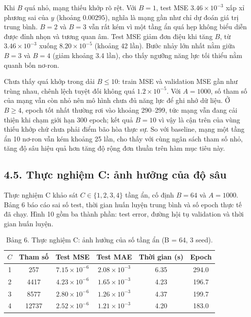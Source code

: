 \documentclass[12pt,a4paper]{article}
\begin{document}
Khi $B$ quá nhỏ, mạng thiếu khớp rõ rệt. Với $B=1$, test MSE $3.46\times10^{-3}$ xấp xỉ phương sai của $y$ (khoảng $0.00295$), nghĩa là mạng gần như chỉ dự đoán giá trị trung bình. $B=2$ và $B=3$ vẫn rất kém vì một tầng ẩn quá hẹp không biểu diễn được đỉnh nhọn và tương quan âm. Test MSE giảm đơn điệu khi tăng $B$, từ $3.46\times10^{-3}$ xuống $8.20\times10^{-5}$ (khoảng 42 lần). Bước nhảy lớn nhất nằm giữa $B=3$ và $B=4$ (giảm khoảng 3.4 lần), cho thấy ngưỡng năng lực tối thiểu nằm quanh bốn nơ-ron.

Chưa thấy quá khớp trong dải $B \le 10$: train MSE và validation MSE gần như trùng nhau, chênh lệch tuyệt đối không quá $1.2\times10^{-5}$. Với $A=1000$, số tham số của mạng vẫn còn nhỏ nên mô hình chưa đủ năng lực để ghi nhớ dữ liệu. Ở $B \ge 4$, epoch tốt nhất thường rơi vào khoảng 290--299, tức mạng vẫn đang cải thiện khi chạm giới hạn 300 epoch; kết quả $B=10$ vì vậy là cận trên của vùng thiếu khớp chứ chưa phải điểm bão hòa thực sự. So với baseline, mạng một tầng ẩn 10 nơ-ron vẫn kém khoảng 25 lần, cho thấy với cùng ngân sách tham số nhỏ, tăng độ sâu hiệu quả hơn tăng độ rộng đơn thuần trên hàm mục tiêu này.

\subsection{4.5. Thực nghiệm C: ảnh hưởng của độ sâu}

Thực nghiệm C khảo sát $C \in \{1, 2, 3, 4\}$ tầng ẩn, cố định $B=64$ và $A=1000$. Bảng 6 báo cáo sai số test, thời gian huấn luyện trung bình và số epoch thực tế đã chạy. Hình 10 gồm ba thành phần: test error, đường hội tụ validation và thời gian huấn luyện.

\begin{table}[h]
\centering
\caption{Bảng 6. Thực nghiệm C: ảnh hưởng của số tầng ẩn (B = 64, 3 seed).}
\begin{tabular}{|c|c|c|c|c|c|}
\hline
$C$ & Tham số & Test MSE & Test MAE & Thời gian (s) & Epoch \\
\hline
1 & 257 & $7.15\times10^{-6}$ & $2.08\times10^{-3}$ & 6.35 & 294.0 \\
\hline
2 & 4417 & $4.23\times10^{-6}$ & $1.65\times10^{-3}$ & 4.23 & 196.7 \\
\hline
3 & 8577 & $2.80\times10^{-6}$ & $1.26\times10^{-3}$ & 4.37 & 199.7 \\
\hline
4 & 12737 & $2.52\times10^{-6}$ & $1.21\times10^{-3}$ & 4.20 & 183.0 \\
\hline
\end{tabular}
\end{table}
\end{document}
